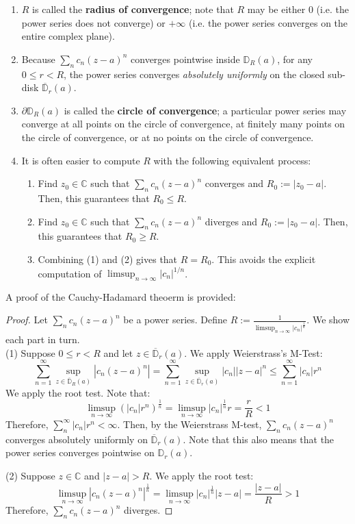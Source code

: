 \begin{enumerate}
    \item[-] $R$ is called the \textbf{radius of convergence}; note that $R$ may be either $0$ (i.e. the power series does not converge) or $+\infty$ (i.e. the power series converges on the entire complex plane).
    \item[-] Because $\sum_n c_n (z-a)^n$ converges pointwise inside $\mathbb{D}_R(a)$, for any $0\leq r<R$, the power series converges \textit{absolutely uniformly} on the closed sub-disk $\overline{\mathbb{D}}_r(a)$.
    \item[-] $\partial \mathbb{D}_R(a)$ is called the \textbf{circle of convergence}; a particular power series may converge at all points on the circle of convergence, at finitely many points on the circle of convergence, or at no points on the circle of convergence.
    \item[-] It is often easier to compute $R$ with the following equivalent process: \begin{enumerate}
        \item[1.] Find $z_0\in\mathbb{C}$ such that $\sum_n c_n (z-a)^n$ converges and $R_0:= |z_0-a|$. Then, this guarantees that $R_0\leq R$.
        \item[2.] Find $z_0\in\mathbb{C}$ such that $\sum_n c_n (z-a)^n$ diverges and $R_0:= |z_0-a|$. Then, this guarantees that $R_0\geq R$.
        \item[3.] Combining (1) and (2) gives that $R= R_0$. This avoids the explicit computation of $\displaystyle\limsup_{n\to\infty} |c_n|^{1/n}$.
    \end{enumerate}
\end{enumerate} \vspace{-1em}A proof of the Cauchy-Hadamard theoerm is provided: \vspace{-1.5em}\begin{proof}
    Let $\sum_n c_n (z-a)^n$ be a power series. Define $R:=\displaystyle\frac{1}{\displaystyle\limsup_{n\to\infty} |c_n|^{\frac{1}{n}}}$. We show each part in turn.\\
    \vspace{-1em}
    (1) Suppose $0\leq r<R$ and let $z\in \mathbb{\overline{D}}_r(a)$. We apply Weierstrass's M-Test: \[
        \sum_{n=1}^\infty \sup_{z\in\overline{\mathbb{D}}_R(a)} \left|c_n (z-a)^n\right| = \sum_{n=1}^\infty \sup_{z\in\overline{\mathbb{D}}_r(a)} |c_n| |z-a|^n \leq  \sum_{n=1}^\infty |c_n|r^n\]
        We apply the root test. Note that: \[\limsup_{n\to\infty}\left(\left|c_n\right|r^n\right)^\frac{1}{n} = \limsup_{n\to\infty}|c_n|^\frac{1}{n} r = \frac{r}{R} < 1\] Therefore, $\sum_n^\infty |c_n|r^n<\infty$. Then, by the Weierstrass M-test, $\sum_n c_n (z-a)^n$ converges absolutely uniformly on $\overline{\mathbb{D}}_r(a)$. Note that this also means that the power series converges pointwise on $\mathbb{D}_r(a)$.

    (2) Suppose $z\in\mathbb{C}$ and $|z-a|>R$. We apply the root test: \[\limsup_{n\to\infty} |c_n (z-a)^n|^\frac{1}{n} = \limsup_{n\to\infty} |c_n|^\frac{1}{n} |z-a| = \frac{|z-a|}{R}  > 1\] Therefore, $\sum_n c_n(z-a)^n$ diverges.
\end{proof}

